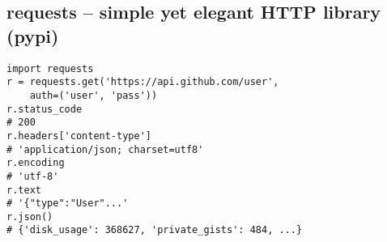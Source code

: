 \subsection{requests -- simple yet elegant HTTP library (pypi)}
\begin{verbatim}
import requests
r = requests.get('https://api.github.com/user',
    auth=('user', 'pass'))
r.status_code
# 200
r.headers['content-type']
# 'application/json; charset=utf8'
r.encoding
# 'utf-8'
r.text
# '{"type":"User"...'
r.json()
# {'disk_usage': 368627, 'private_gists': 484, ...}
\end{verbatim}
